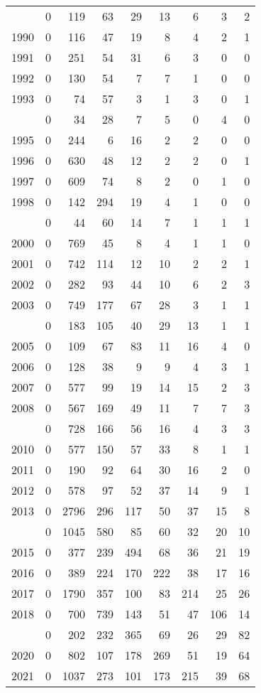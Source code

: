 \documentclass[
]{article}
\begin{document}
\begin{longtable}[t]{lrrrrrrrr}
\endfoot
\bottomrule
\endlastfoot
1989 & 0 & 119 & 63 & 29 & 13 & 6 & 3 & 2\\
1990 & 0 & 116 & 47 & 19 & 8 & 4 & 2 & 1\\
1991 & 0 & 251 & 54 & 31 & 6 & 3 & 0 & 0\\
1992 & 0 & 130 & 54 & 7 & 7 & 1 & 0 & 0\\
1993 & 0 & 74 & 57 & 3 & 1 & 3 & 0 & 1\\
\addlinespace
1994 & 0 & 34 & 28 & 7 & 5 & 0 & 4 & 0\\
1995 & 0 & 244 & 6 & 16 & 2 & 2 & 0 & 0\\
1996 & 0 & 630 & 48 & 12 & 2 & 2 & 0 & 1\\
1997 & 0 & 609 & 74 & 8 & 2 & 0 & 1 & 0\\
1998 & 0 & 142 & 294 & 19 & 4 & 1 & 0 & 0\\
\addlinespace
1999 & 0 & 44 & 60 & 14 & 7 & 1 & 1 & 1\\
2000 & 0 & 769 & 45 & 8 & 4 & 1 & 1 & 0\\
2001 & 0 & 742 & 114 & 12 & 10 & 2 & 2 & 1\\
2002 & 0 & 282 & 93 & 44 & 10 & 6 & 2 & 3\\
2003 & 0 & 749 & 177 & 67 & 28 & 3 & 1 & 1\\
\addlinespace
2004 & 0 & 183 & 105 & 40 & 29 & 13 & 1 & 1\\
2005 & 0 & 109 & 67 & 83 & 11 & 16 & 4 & 0\\
2006 & 0 & 128 & 38 & 9 & 9 & 4 & 3 & 1\\
2007 & 0 & 577 & 99 & 19 & 14 & 15 & 2 & 3\\
2008 & 0 & 567 & 169 & 49 & 11 & 7 & 7 & 3\\
\addlinespace
2009 & 0 & 728 & 166 & 56 & 16 & 4 & 3 & 3\\
2010 & 0 & 577 & 150 & 57 & 33 & 8 & 1 & 1\\
2011 & 0 & 190 & 92 & 64 & 30 & 16 & 2 & 0\\
2012 & 0 & 578 & 97 & 52 & 37 & 14 & 9 & 1\\
2013 & 0 & 2796 & 296 & 117 & 50 & 37 & 15 & 8\\
\addlinespace
2014 & 0 & 1045 & 580 & 85 & 60 & 32 & 20 & 10\\
2015 & 0 & 377 & 239 & 494 & 68 & 36 & 21 & 19\\
2016 & 0 & 389 & 224 & 170 & 222 & 38 & 17 & 16\\
2017 & 0 & 1790 & 357 & 100 & 83 & 214 & 25 & 26\\
2018 & 0 & 700 & 739 & 143 & 51 & 47 & 106 & 14\\
\addlinespace
2019 & 0 & 202 & 232 & 365 & 69 & 26 & 29 & 82\\
2020 & 0 & 802 & 107 & 178 & 269 & 51 & 19 & 64\\
2021 & 0 & 1037 & 273 & 101 & 173 & 215 & 39 & 68\\*
\end{longtable}
\end{document}
